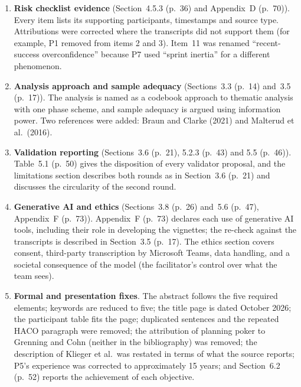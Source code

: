\documentclass[12pt,a4paper,twoside]{article}
\begin{document}
\begin{enumerate}
  \item \textbf{Risk checklist evidence} (Section~4.5.3 (p.~36) and Appendix~D (p.~70)). Every item lists
        its supporting participants, timestamps and source type. Attributions were
        corrected where the transcripts did not support them (for example, P1 removed
        from items 2 and 3). Item~11 was renamed ``recent-success overconfidence''
        because P7 used ``sprint inertia'' for a different phenomenon.

  \item \textbf{Analysis approach and sample adequacy} (Sections~3.3 (p.~14) and~3.5 (p.~17)). The
        analysis is named as a codebook approach to thematic analysis with one phase
        scheme, and sample adequacy is argued using information power. Two references
        were added: Braun and Clarke (2021) and Malterud et al.\ (2016).

  \item \textbf{Validation reporting} (Sections~3.6 (p.~21), 5.2.3 (p.~43) and 5.5 (p.~46)). Table~5.1 (p.~50) gives the
        disposition of every validator proposal, and the limitations section describes
        both rounds as in Section~3.6 (p.~21) and discusses the circularity of the second round.

  \item \textbf{Generative AI and ethics} (Sections~3.8 (p.~26) and~5.6 (p.~47), Appendix~F (p.~73)). Appendix~F (p.~73)
        declares each use of generative AI tools, including their role in developing
        the vignettes; the re-check against the transcripts is described in
        Section~3.5 (p.~17). The ethics section covers consent,
        third-party transcription by Microsoft Teams, data handling, and a societal
        consequence of the model (the facilitator's control over what the team sees).

  \item \textbf{Formal and presentation fixes}. The abstract follows the five required
        elements; keywords are reduced to five; the title page is dated October 2026;
        the participant table fits the page; duplicated sentences and the repeated HACO
        paragraph were removed; the attribution of planning poker to Grenning and Cohn
        (neither in the bibliography) was removed; the description of Klieger et al.\ was
        restated in terms of what the source reports; P5's experience was corrected to
        approximately 15 years; and Section~6.2 (p.~52) reports the achievement of each objective.



\end{enumerate}
\end{document}
